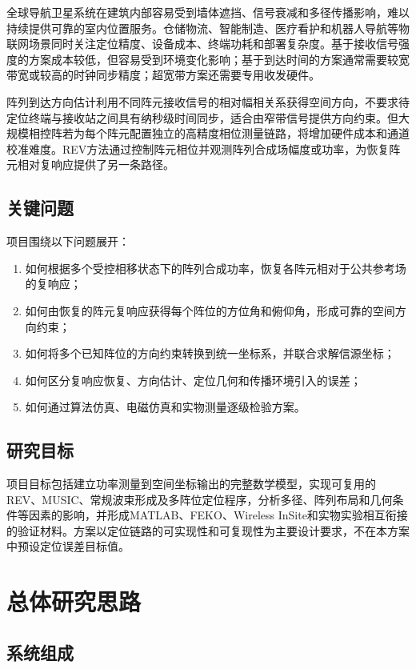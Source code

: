 \documentclass[UTF8,a4paper,12pt]{ctexart}
\begin{document}
全球导航卫星系统在建筑内部容易受到墙体遮挡、信号衰减和多径传播影响，难以持续提供可靠的室内位置服务。仓储物流、智能制造、医疗看护和机器人导航等物联网场景同时关注定位精度、设备成本、终端功耗和部署复杂度。基于接收信号强度的方案成本较低，但容易受到环境变化影响；基于到达时间的方案通常需要较宽带宽或较高的时钟同步精度；超宽带方案还需要专用收发硬件。

阵列到达方向估计利用不同阵元接收信号的相对幅相关系获得空间方向，不要求待定位终端与接收站之间具有纳秒级时间同步，适合由窄带信号提供方向约束。但大规模相控阵若为每个阵元配置独立的高精度相位测量链路，将增加硬件成本和通道校准难度。REV方法通过控制阵元相位并观测阵列合成场幅度或功率，为恢复阵元相对复响应提供了另一条路径。

\subsection{关键问题}

项目围绕以下问题展开：

\begin{enumerate}
  \item 如何根据多个受控相移状态下的阵列合成功率，恢复各阵元相对于公共参考场的复响应；
  \item 如何由恢复的阵元复响应获得每个阵位的方位角和俯仰角，形成可靠的空间方向约束；
  \item 如何将多个已知阵位的方向约束转换到统一坐标系，并联合求解信源坐标；
  \item 如何区分复响应恢复、方向估计、定位几何和传播环境引入的误差；
  \item 如何通过算法仿真、电磁仿真和实物测量逐级检验方案。
\end{enumerate}

\subsection{研究目标}

项目目标包括建立功率测量到空间坐标输出的完整数学模型，实现可复用的REV、MUSIC、常规波束形成及多阵位定位程序，分析多径、阵列布局和几何条件等因素的影响，并形成MATLAB、FEKO、Wireless InSite和实物实验相互衔接的验证材料。方案以定位链路的可实现性和可复现性为主要设计要求，不在本方案中预设定位误差目标值。

\section{总体研究思路}

\subsection{系统组成}
\end{document}

